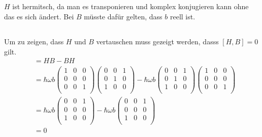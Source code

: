 \subsection{}
$H$ ist hermitsch, da man es transponieren und komplex konjugieren kann ohne das es sich ändert. Bei $B$ müsste dafür gelten, dass $b$ reell ist.

\subsection{}
Um zu zeigen, dass $H$ und $B$ vertauschen muss gezeigt werden, dasss $[H,B] = 0$ gilt.
\begin{align*}
    [H,B] &= HB-BH \\
          &= \hbar\omega b
    \begin{pmatrix}
        1 &0 &0 \\
        0 &0 &0 \\
        0 &0 &1 \\
    \end{pmatrix}\begin{pmatrix}
        0 &0 &1 \\
        0 &1 &0 \\
        1 &0 &0 \\
    \end{pmatrix} 
    -\hbar\omega b
   \begin{pmatrix}
        0 &0 &1 \\
        0 &1 &0 \\
        1 &0 &0 \\
    \end{pmatrix} \begin{pmatrix}
        1 &0 &0 \\
        0 &0 &0 \\
        0 &0 &1 \\
    \end{pmatrix} \\
    &= \hbar\omega b
    \begin{pmatrix}
        0 &0 &1 \\
        0 &0 &0 \\
        1 &0 &0 \\
    \end{pmatrix} 
    -\hbar\omega b
    \begin{pmatrix}
        0 &0 &1 \\
        0 &0 &0 \\
        1 &0 &0 \\
    \end{pmatrix} \\
    &= 0
\end{align*}

